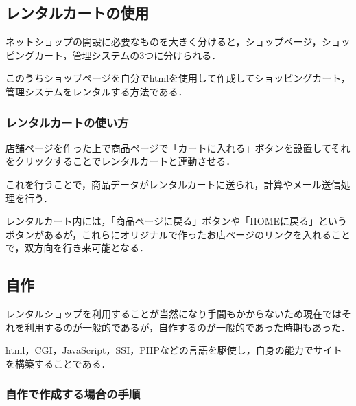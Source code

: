 \subsection{レンタルカートの使用}

ネットショップの開設に必要なものを大きく分けると，ショップページ，ショッピングカート，管理システムの3つに分けられる．

このうちショップページを自分でhtmlを使用して作成してショッピングカート，管理システムをレンタルする方法である．

\subsubsection{レンタルカートの使い方}

店舗ページを作った上で商品ページで「カートに入れる」ボタンを設置してそれをクリックすることでレンタルカートと連動させる．

これを行うことで，商品データがレンタルカートに送られ，計算やメール送信処理を行う．

レンタルカート内には，「商品ページに戻る」ボタンや「HOMEに戻る」というボタンがあるが，これらにオリジナルで作ったお店ページのリンクを入れることで，双方向を行き来可能となる．


\subsection{自作}

レンタルショップを利用することが当然になり手間もかからないため現在ではそれを利用するのが一般的であるが，自作するのが一般的であった時期もあった．

html，CGI，JavaScript，SSI，PHPなどの言語を駆使し，自身の能力でサイトを構築することである．


\subsubsection{自作で作成する場合の手順}

